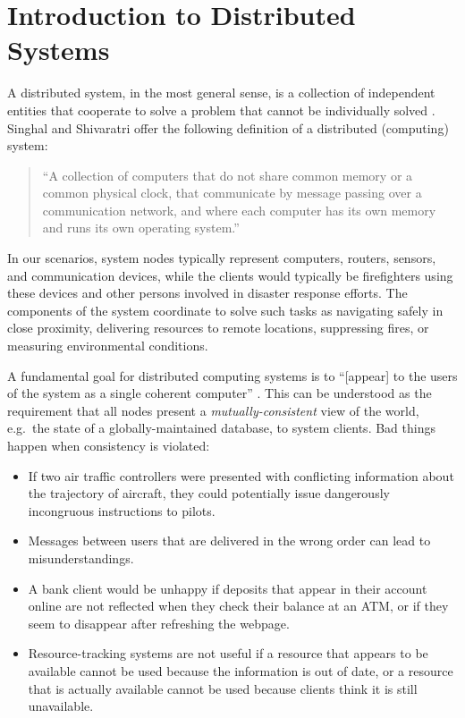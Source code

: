 \documentclass[]             %
{NASA}                       %
\theoremstyle{definition}
\begin{document}
\newpage

\section{Introduction to Distributed
Systems}\label{introduction-to-distributed-systems}

\label{sec:background}

A distributed system, in the most general sense, is a collection of
independent entities that cooperate to solve a problem that cannot be
individually solved \cite{kshemkalyani_singhal_2008}. Singhal and
Shivaratri \cite{10.5555/562065} offer the following definition of a
distributed (computing) system:

\begin{quote}
``A collection of computers that do not share common memory or a common
physical clock, that communicate by message passing over a communication
network, and where each computer has its own memory and runs its own
operating system.''
\end{quote}

In our scenarios, system nodes typically represent computers, routers,
sensors, and communication devices, while the clients would typically be
firefighters using these devices and other persons involved in disaster
response efforts. The components of the system coordinate to solve such
tasks as navigating safely in close proximity, delivering resources to
remote locations, suppressing fires, or measuring environmental
conditions.

A fundamental goal for distributed computing systems is to
``{[}appear{]} to the users of the system as a single coherent
computer'' \cite{TanenbaumSteen07}. This can be understood as the
requirement that all nodes present a \emph{mutually-consistent} view of
the world, e.g.~the state of a globally-maintained database, to system
clients. Bad things happen when consistency is violated:

\begin{itemize}
\item
  If two air traffic controllers were presented with conflicting
  information about the trajectory of aircraft, they could potentially
  issue dangerously incongruous instructions to pilots.
\item
  Messages between users that are delivered in the wrong order can lead
  to misunderstandings.
\item
  A bank client would be unhappy if deposits that appear in their
  account online are not reflected when they check their balance at an
  ATM, or if they seem to disappear after refreshing the webpage.
\item
  Resource-tracking systems are not useful if a resource that appears to
  be available cannot be used because the information is out of date, or
  a resource that is actually available cannot be used because clients
  think it is still unavailable.
\end{itemize}
\end{document}
